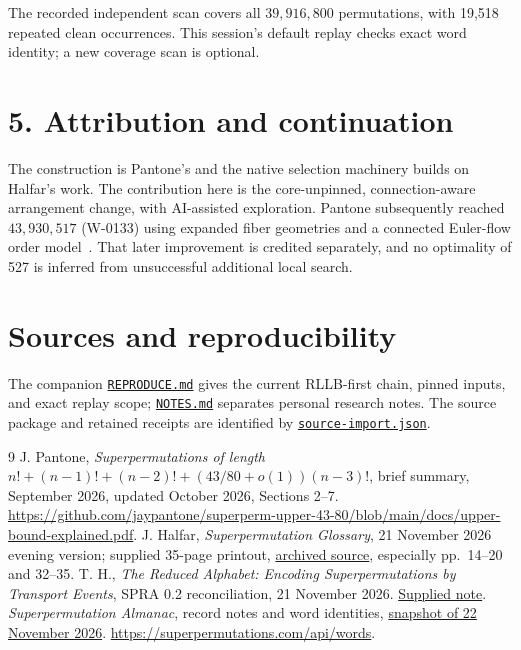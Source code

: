 \documentclass[11pt]{article}
\begin{document}
The recorded independent scan covers all $39{,}916{,}800$ permutations,
with 19,518 repeated clean occurrences. This session's default replay
checks exact word identity; a new coverage scan is optional.

\section*{5. Attribution and continuation}
The construction is Pantone's and the native selection machinery builds
on Halfar's work. The contribution here is the core-unpinned,
connection-aware arrangement change, with AI-assisted exploration.
Pantone subsequently reached $43{,}930{,}517$ (W-0133) using expanded
fiber geometries and a connected Euler-flow order model~\cite{almanac}.
That later improvement is credited separately, and no optimality of 527
is inferred from unsuccessful additional local search.

\section*{Sources and reproducibility}
The companion \href{REPRODUCE.md}{\texttt{REPRODUCE.md}} gives the current
RLLB-first chain, pinned inputs, and exact replay scope;
\href{NOTES.md}{\texttt{NOTES.md}} separates personal research notes.
The source package and retained receipts are identified by
\href{source-import.json}{\texttt{source-import.json}}.

\begin{thebibliography}{9}\footnotesize
\setlength{\itemsep}{2pt}
 J. Pantone,
\emph{Superpermutations of length
$n!+(n-1)!+(n-2)!+(43/80+o(1))(n-3)!$}, brief summary,
September 2026, updated October 2026, Sections 2--7.
\url{https://github.com/jaypantone/superperm-upper-43-80/blob/main/docs/upper-bound-explained.pdf}.
 J. Halfar, \emph{Superpermutation Glossary},
21 November 2026 evening version; supplied 35-page printout,
\href{../../rllb/sources/Glossary.pdf}{archived source}, especially pp.~14--20 and 32--35.
 T. H., \emph{The Reduced Alphabet: Encoding Superpermutations
by Transport Events}, SPRA 0.2 reconciliation, 21 November 2026.
\href{../../rllb/sources/the-reduced-alphabet-spra-0.2-reconciled.md}{Supplied note}.
 \emph{Superpermutation Almanac}, record notes and word identities,
\href{../../rllb/almanac-snapshot.json}{snapshot of 22 November 2026}.
\url{https://superpermutations.com/api/words}.
\end{thebibliography}
\end{document}
